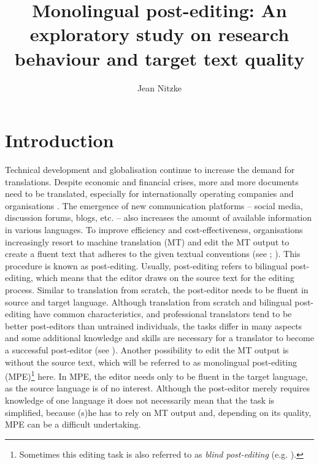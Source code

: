 \documentclass[output=paper]{langsci/langscibook}
\author{Jean Nitzke\affiliation{Johannes Gutenberg University of Mainz in Germersheim}
}
\title{Monolingual post-editing: {A}n exploratory study on research behaviour and target text quality}
\begin{document}
 
    



\section{Introduction\label{nitzke:sec:Introduction}}

Technical development and globalisation continue to increase the demand for translations. Despite economic and financial crises, more and more documents need to be translated, especially for internationally operating companies and organisations \citep{Schmitt2003, DePalma2009}. The emergence of new communication platforms -- social media, discussion forums, blogs, etc. -- also increases the amount of available information in various languages. To improve efficiency and cost-effectiveness, organisations increasingly resort to machine translation (MT) and edit the MT output to create a fluent text that adheres to the given textual conventions (see \citealt{obrien2011}; \citealt{Elsen2012}). This procedure is known as post-editing. Usually, post-editing refers to bilingual post-editing, which means that the editor draws on the source text for the editing process. Similar to translation from scratch, the post-editor needs to be fluent in source and target language. Although translation from scratch and bilingual post-editing have common characteristics, and professional translators tend to be better post-editors than untrained individuals, the tasks differ in many aspects and some additional knowledge and skills are necessary for a translator to become a successful post-editor (see \citealt{obrien2002}). Another possibility to edit the MT output is without the source text, which will be referred to as monolingual post-editing (MPE)\footnote{Sometimes this editing task is also referred to as \textit{blind post-editing }(e.g. \citealt{carl2013}).} here. In MPE, the editor needs only to be fluent in the target language, as the source language is of no interest. Although the post-editor merely requires knowledge of one language it does not necessarily mean that the task is simplified, because (s)he has to rely on MT output and, depending on its quality, MPE can be a difficult undertaking.
\end{document}

